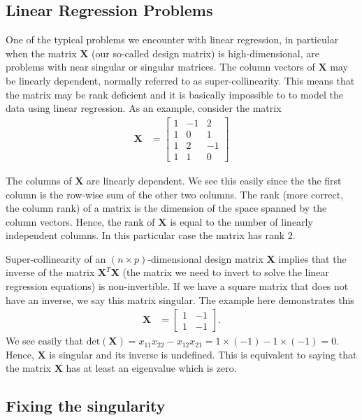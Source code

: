 \documentclass[%
oneside,                 %
final,                   %
10pt]{article}
\begin{document}
\subsection{Linear Regression Problems}

One of the typical problems we encounter with linear regression, in particular 
when the matrix $\bm{X}$ (our so-called design matrix) is high-dimensional, 
are problems with near singular or singular matrices. The column vectors of $\bm{X}$ 
may be linearly dependent, normally referred to as super-collinearity.  
This means that the matrix may be rank deficient and it is basically impossible to 
to model the data using linear regression. As an example, consider the matrix
\begin{align*}
\mathbf{X} & =  \left[
\begin{array}{rrr}
1 & -1 & 2
\\
1 & 0 & 1
\\
1 & 2  & -1
\\
1 & 1  & 0
\end{array} \right]
\end{align*}

The columns of $\bm{X}$ are linearly dependent. We see this easily since the 
the first column is the row-wise sum of the other two columns. The rank (more correct,
the column rank) of a matrix is the dimension of the space spanned by the
column vectors. Hence, the rank of $\mathbf{X}$ is equal to the number
of linearly independent columns. In this particular case the matrix has rank 2.

Super-collinearity of an $(n \times p)$-dimensional design matrix $\mathbf{X}$ implies
that the inverse of the matrix $\bm{X}^T\bm{X}$ (the matrix we need to invert to solve the linear regression equations) is non-invertible. If we have a square matrix that does not have an inverse, we say this matrix singular. The example here demonstrates this
\begin{align*}
\bm{X} & =  \left[
\begin{array}{rr}
1 & -1
\\
1 & -1
\end{array} \right].
\end{align*}
We see easily that  $\mbox{det}(\bm{X}) = x_{11} x_{22} - x_{12} x_{21} = 1 \times (-1) - 1 \times (-1) = 0$. Hence, $\mathbf{X}$ is singular and its inverse is undefined.
This is equivalent to saying that the matrix $\bm{X}$ has at least an eigenvalue which is zero.

\subsection{Fixing the singularity}
\end{document}
